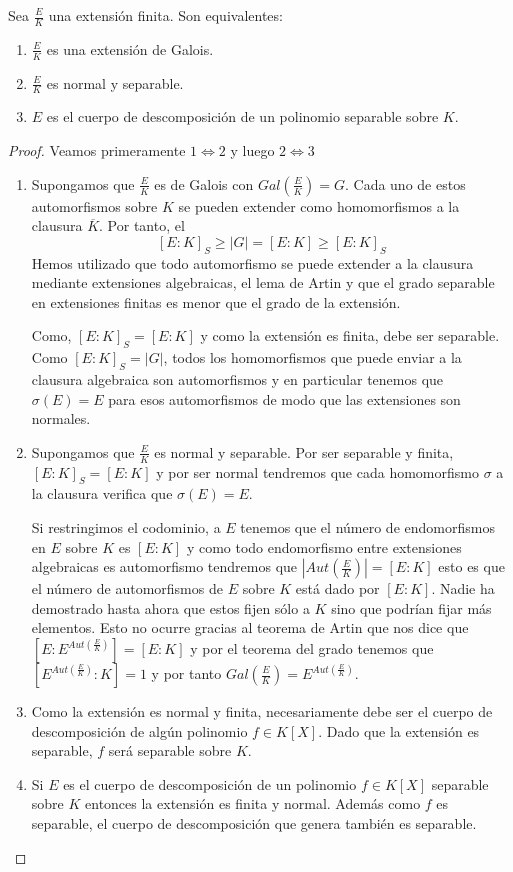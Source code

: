 \begin{proposition}
Sea $\frac{E}{K}$ una extensión finita. Son equivalentes:

\begin{enumerate}
\item $\frac{E}{K}$ es una extensión de Galois.
\item $\frac{E}{K}$ es normal y separable.
\item $E$ es el cuerpo de descomposición de un polinomio separable sobre $K$. 
\end{enumerate}
\end{proposition}
\begin{proof}
Veamos primeramente $1 \iff 2$ y luego $2 \iff 3$

\begin{enumerate}
\item Supongamos que $\frac{E}{K}$ es de Galois con $Gal(\frac{E}{K}) = G$. Cada uno de estos automorfismos sobre $K$ se pueden extender como homomorfismos a la clausura $\overline{K}$. Por tanto, el $$[E:K]_S \ge |G| = [E:K] \ge [E:K]_S$$ Hemos utilizado que todo automorfismo se puede extender a la clausura mediante extensiones algebraicas, el lema de Artin y que el grado separable en extensiones finitas es menor que el grado de la extensión. 

Como, $[E:K]_S = [E:K]$ y como la extensión es finita, debe ser separable. Como $[E:K]_S = |G|$, todos los homomorfismos que puede enviar a la clausura algebraica son automorfismos y en particular tenemos que $\sigma(E) = E$ para esos automorfismos de modo que las extensiones son normales. 

\item Supongamos que $\frac{E}{K}$ es normal y separable. Por ser separable y finita, $[E:K]_S = [E:K]$ y por ser normal tendremos que cada homomorfismo $\sigma$ a la clausura verifica que $\sigma(E) = E$. 

Si restringimos el codominio, a $E$ tenemos que el número de endomorfismos en $E$ sobre $K$ es $[E:K]$ y como todo endomorfismo entre extensiones algebraicas es automorfismo tendremos que $|Aut(\frac{E}{K})| = [E:K]$ esto es que el número de automorfismos de $E$ sobre $K$ está dado por $[E:K]$. Nadie ha demostrado hasta ahora que estos fijen sólo a $K$ sino que podrían fijar más elementos. Esto no ocurre gracias al teorema de Artin que nos dice que $[E:E^{Aut(\frac{E}{K})}] = [E:K]$ y por el teorema del grado tenemos que $[E^{Aut(\frac{E}{K})}:K] = 1$ y por tanto $Gal(\frac{E}{K}) = E^{Aut(\frac{E}{K})}$.

\item Como la extensión es normal y finita, necesariamente debe ser el cuerpo de descomposición de algún polinomio $f \in K[X]$. Dado que la extensión es separable, $f$ será separable sobre $K$. 

\item Si $E$ es el cuerpo de descomposición de un polinomio $f \in K[X]$ separable sobre $K$ entonces la extensión es finita y normal. Además como $f$ es separable, el cuerpo de descomposición que genera también es separable. 
\end{enumerate}
\end{proof}


